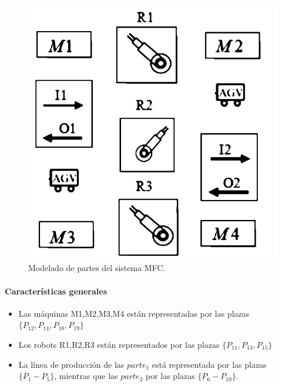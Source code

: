 \begin{figure}[H]
	\centering
	\includegraphics[scale=0.45]{Figures/algoritmo3/mfcmodelado.png}
	\caption[Modelado de partes del sistema MFC.]{Modelado de partes del sistema MFC\footnotemark.}
	\label{fig:sistema_mfc}
 \end{figure} 
\bigskip

\paragraph{Características generales}
\begin{itemize}
    \item Las máquinas M1,M2,M3,M4 están representadas por las plazas $\{P_{12}, P_{14}, P_{18}, P_{19}\}$
    \item Los robots R1,R2,R3 están representados por las plazas $\{P_{11}, P_{13}, P_{15}\}$
    \item La línea de producción de las ${parte_1}$ está representada por las plazas $\{P_1-P_5\}$, mientras que las ${parte_2}$ por las plazas $\{P_6-P_{10}\}$.
\end{itemize}

